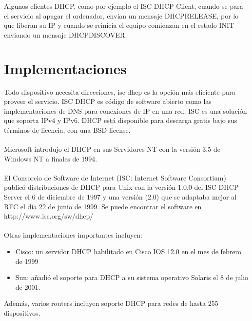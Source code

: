 Algunos clientes DHCP, como por ejemplo el ISC DHCP Client, cuando se para el servicio al apagar el ordenador, envían un mensaje DHCPRELEASE, por lo que liberan su IP y cuando se reinicia el equipo comienzan en el estado INIT enviando un mensaje DHCPDISCOVER.


\section{Implementaciones}
	Todo dispositivo necesita direcciones, isc-dhcp es la opción más eficiente para proveer el servicio. ISC DHCP es código de software abierto como las implementaciones de DNS para conexiones de IP en una red. ISC es una solución que soporta IPv4 y IPv6. DHCP está disponible para descarga gratis bajo sus términos de licencia, con una BSD license.\\\\
	
	Microsoft introdujo el DHCP en sus Servidores NT con la versión 3.5 de Windows NT a finales de 1994.\\\\
	El Consorcio de Software de Internet (ISC: Internet Software Consortium) publicó distribuciones de DHCP para Unix con la versión 1.0.0 del ISC DHCP Server el 6 de diciembre de 1997 y una versión (2.0) que se adaptaba mejor al RFC el día 22 de junio de 1999. Se puede encontrar el software en http://www.isc.org/sw/dhcp/\\\\

Otras implementaciones importantes incluyen:
\begin{itemize}
	\item Cisco: un servidor DHCP habilitado en Cisco IOS 12.0 en el mes de febrero de 1999
	\item Sun: añadió el soporte para DHCP a su sistema operativo Solaris el 8 de julio de 2001.
\end{itemize}

Además, varios routers incluyen soporte DHCP para redes de hasta 255 dispositivos.



	
